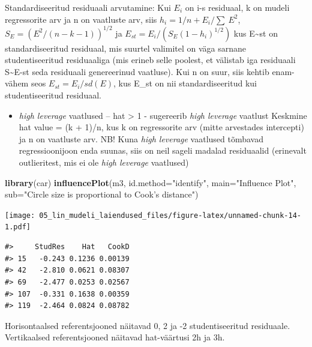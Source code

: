 \documentclass[]{book}
\newenvironment{Shaded}{\begin{snugshade}}{\end{snugshade}}
\newcommand{\DataTypeTok}[1]{\textcolor[rgb]{0.13,0.29,0.53}{#1}}
\newcommand{\KeywordTok}[1]{\textcolor[rgb]{0.13,0.29,0.53}{\textbf{#1}}}
\newcommand{\NormalTok}[1]{#1}
\newcommand{\StringTok}[1]{\textcolor[rgb]{0.31,0.60,0.02}{#1}}
\providecommand{\tightlist}{%
  \setlength{\itemsep}{0pt}\setlength{\parskip}{0pt}}
\begin{document}
Standardiseeritud residuaali arvutamine: Kui \(E_i\) on i-s residuaal, k on mudeli regressorite arv ja n on vaatluste arv, siis \(h_i = 1/n + E_i/\sum~E^2\), \(S_E = (E^2/(n - k -1))^{1/2}\) ja \(E_{st} = E_i/(S_E(1 - h_i)^{1/2})\) kus E\textasciitilde{}st on standardiseeritud residuaal, mis suurtel valimitel on väga sarnane studentiseeritud residuaaliga (mis erineb selle poolest, et välistab iga residuaali S\textasciitilde{}E-st seda residuaali genereerinud vaatluse). Kui n on suur, siis kehtib enam-vähem seos \(E_{st} = E_i/sd(E)\), kus E\_st on nii standardiseeritud kui studentiseeritud residuaal.

\begin{itemize}
\tightlist
\item
  \emph{high leverage} vaatlused -- hat \textgreater{} 1 - sugereerib \emph{high leverage} vaatlust
  Keskmine hat value = (k + 1)/n, kus k on regressorite arv (mitte arvestades intercepti) ja n on vaatluste arv. NB! Kuna \emph{high leverage} vaatlused tõmbavad regressioonijoon enda suunas, siis on neil sageli madalad residuaalid (erinevalt outlieritest, mis ei ole \emph{high leverage} vaatlused)
\end{itemize}

\begin{Shaded}
\begin{Highlighting}[]
\KeywordTok{library}\NormalTok{(car)}
\KeywordTok{influencePlot}\NormalTok{(m3, }\DataTypeTok{id.method=}\StringTok{"identify"}\NormalTok{, }\DataTypeTok{main=}\StringTok{"Influence Plot"}\NormalTok{,}
              \DataTypeTok{sub=}\StringTok{"Circle size is proportional to Cook's distance"}\NormalTok{)}
\end{Highlighting}
\end{Shaded}

\texttt{[image: 05\_lin\_mudeli\_laiendused\_files/figure-latex/unnamed-chunk-14-1.pdf]}

\begin{verbatim}
#>     StudRes    Hat   CookD
#> 15   -0.243 0.1236 0.00139
#> 42   -2.810 0.0621 0.08307
#> 69   -2.477 0.0253 0.02567
#> 107  -0.331 0.1638 0.00359
#> 119  -2.464 0.0824 0.08782
\end{verbatim}

Horisontaalsed referentsjooned näitavad 0, 2 ja -2 studentiseeritud residuaale.
Vertikaalsed referentsjooned näitavad hat-väärtusi 2h ja 3h.
\end{document}
